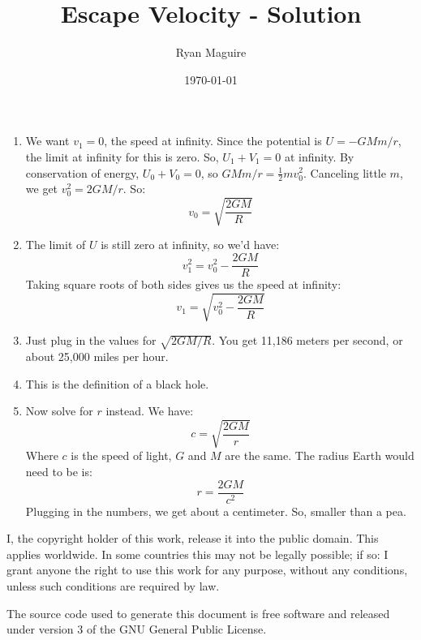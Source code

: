 \documentclass{article}
\title{Escape Velocity - Solution}
\author{Ryan Maguire}
\date{\today}
\begin{document}
    \maketitle
    \begin{enumerate}
        \item   We want $v_{1}=0$, the speed at infinity. Since the potential is
                $U=-GMm/r$, the limit at infinity for this is zero. So,
                $U_{1}+V_{1}=0$ at infinity. By conservation of energy,
                $U_{0}+V_{0}=0$, so $GMm/r=\frac{1}{2}mv_{0}^{2}$.
                Canceling little $m$, we get $v_{0}^{2}=2GM/r$. So:
                \begin{equation}
                  v_{0}=\sqrt{\frac{2GM}{R}}
                \end{equation}
        \item   The limit of $U$ is still zero at infinity, so we'd have:
                \begin{equation}
                    v_{1}^{2}=v_{0}^{2}-\frac{2GM}{R}
                \end{equation}
                Taking square roots of both sides gives us the speed at
                infinity:
                \begin{equation}
                    v_{1}=\sqrt{v_{0}^{2}-\frac{2GM}{R}}
                \end{equation}
        \item   Just plug in the values for $\sqrt{2GM/R}$. You get
                11,186 meters per second, or about 25,000 miles per hour.
        \item   This is the definition of a black hole.
        \item   Now solve for $r$ instead. We have:
                \begin{equation}
                    c=\sqrt{\frac{2GM}{r}}
                \end{equation}
                Where $c$ is the speed of light, $G$ and $M$ are the same. The
                radius Earth would need to be is:
                \begin{equation}
                    r=\frac{2GM}{c^{2}}
                \end{equation}
                Plugging in the numbers, we get about a centimeter. So, smaller
                than a pea.
    \end{enumerate}
    \newpage
    I, the copyright holder of this work, release it into the public domain.
    This applies worldwide. In some countries this may not be legally possible;
    if so: I grant anyone the right to use this work for any purpose, without
    any conditions, unless such conditions are required by law.
    \par\hfill\par
    The source code used to generate this document is free software and released
    under version 3 of the GNU General Public License.
\end{document}
